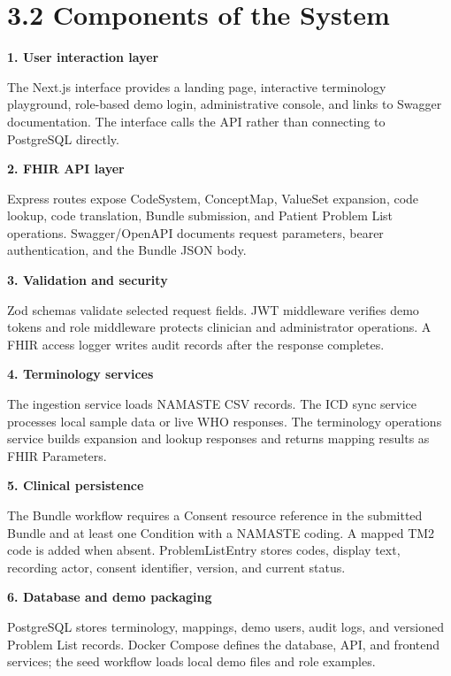 \documentclass[12pt,a4paper,oneside]{report}
\begin{document}
\section*{3.2 Components of the System}
\textbf{1. User interaction layer}

The Next.js interface provides a landing page, interactive terminology playground, role-based demo login, administrative console, and links to Swagger documentation. The interface calls the API rather than connecting to PostgreSQL directly.

\textbf{2. FHIR API layer}

Express routes expose CodeSystem, ConceptMap, ValueSet expansion, code lookup, code translation, Bundle submission, and Patient Problem List operations. Swagger/OpenAPI documents request parameters, bearer authentication, and the Bundle JSON body.

\textbf{3. Validation and security}

Zod schemas validate selected request fields. JWT middleware verifies demo tokens and role middleware protects clinician and administrator operations. A FHIR access logger writes audit records after the response completes.

\textbf{4. Terminology services}

The ingestion service loads NAMASTE CSV records. The ICD sync service processes local sample data or live WHO responses. The terminology operations service builds expansion and lookup responses and returns mapping results as FHIR Parameters.

\textbf{5. Clinical persistence}

The Bundle workflow requires a Consent resource reference in the submitted Bundle and at least one Condition with a NAMASTE coding. A mapped TM2 code is added when absent. ProblemListEntry stores codes, display text, recording actor, consent identifier, version, and current status.

\textbf{6. Database and demo packaging}

PostgreSQL stores terminology, mappings, demo users, audit logs, and versioned Problem List records. Docker Compose defines the database, API, and frontend services; the seed workflow loads local demo files and role examples.
\end{document}
